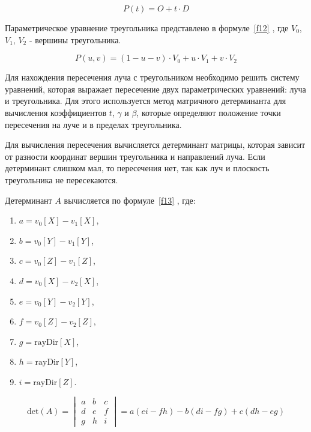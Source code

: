 \begin{equation}
P(t) = O + t \cdot D
\label{f11}
\end{equation}

Параметрическое уравнение треугольника представлено в формуле~\ref{f12} \cite{sherley}, где $V_{0}$, $V_{1}$, $V_{2}$  - вершины треугольника.

\begin{equation}
P(u, v) = (1 - u - v) \cdot V_{0} + u \cdot V_{1} + v \cdot V_{2}
\label{f12}
\end{equation}

Для нахождения пересечения луча с треугольником необходимо решить систему уравнений, которая выражает пересечение двух параметрических уравнений: луча и треугольника. Для этого используется метод матричного детерминанта для вычисления коэффициентов \( t \), \( \gamma \) и \( \beta \), которые определяют положение точки пересечения на луче и в пределах треугольника.

Для вычисления пересечения вычисляется детерминант матрицы, которая зависит от разности координат вершин треугольника и направлений луча. Если детерминант слишком мал, то пересечения нет, так как луч и плоскость треугольника не пересекаются.

Детерминант $A$ вычисляется по формуле~\ref{f13} \cite{sherley}, где:
\begin{enumerate}
    \item \(a = v_0[X] - v_1[X]\),
    \item \(b = v_0[Y] - v_1[Y]\),
    \item \(c = v_0[Z] - v_1[Z]\),
    \item \(d = v_0[X] - v_2[X]\),
    \item \(e = v_0[Y] - v_2[Y]\),
    \item \(f = v_0[Z] - v_2[Z]\),
    \item \(g = \text{rayDir}[X]\),
    \item \(h = \text{rayDir}[Y]\),
    \item \(i = \text{rayDir}[Z]\).
\end{enumerate}

\begin{equation}
\text{det}(A) = 
\begin{vmatrix}
a & b & c \\
d & e & f \\
g & h & i
\end{vmatrix} = a(ei - fh) - b(di - fg) + c(dh - eg)
\label{f13}
\end{equation}

